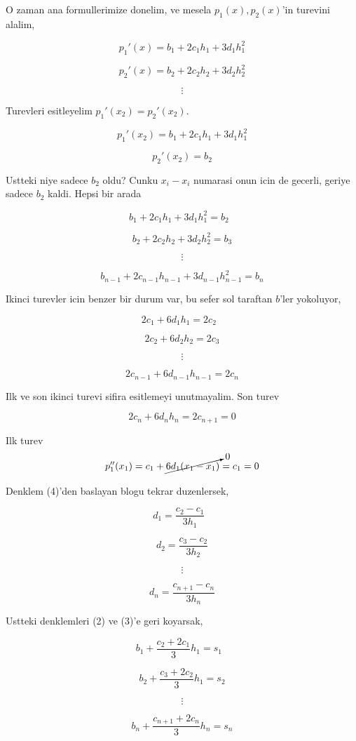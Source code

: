 \documentclass[12pt,fleqn]{article}\usepackage{common}
\begin{document}
O zaman ana formullerimize donelim, ve mesela $p_1(x),p_2(x)$'in turevini
alalim,

\[ p_1'(x) = b_1 + 2c_1h_1 + 3d_1h_1^2 \]

\[ p_2'(x) = b_2 + 2c_2h_2 + 3d_2h_2^2 \]

\[ \vdots \]


Turevleri esitleyelim $p_1'(x_2) = p_2'(x_2)$. 

\[ p_1'(x_2) = b_1 + 2c_1h_1 + 3d_1h_1^2 \]

\[  p_2'(x_2) = b_2 \]

Ustteki niye sadece $b_2$ oldu? Cunku $x_i-x_i$ numarasi onun icin de
gecerli, geriye sadece $b_2$ kaldi. Hepsi bir arada

\[  b_1 + 2c_1h_1 + 3d_1h_1^2  = b_2 \ \ \ \label{3}\]

\[  b_2 + 2c_2h_2 + 3d_2h_2^2 = b_3 \]

\[ \vdots \]

\[  b_{n-1} + 2c_{n-1}h_{n-1} + 3d_{n-1}h_{n-1}^2 =  b_n \]

Ikinci turevler icin benzer bir durum var, bu sefer sol taraftan $b$'ler
yokoluyor, 

\[ 2c_1 + 6d_1h_1 = 2c_2 \ \ \ \label{4} \]

\[ 2c_2 + 6d_2h_2 = 2c_3 \]

\[ \vdots \]

\[ 2c_{n-1} + 6d_{n-1}h_{n-1} = 2c_n \]

Ilk ve son ikinci turevi sifira esitlemeyi unutmayalim. Son turev

\[ 2c_n + 6d_nh_n = 2c_{n+1} = 0 \]

Ilk turev
\[ p_1''(x_1) =  c_1 + \cancelto{0}{6d_1(x_1-x_1)}  = c_1 = 0\]

Denklem (4)'den baslayan blogu tekrar duzenlersek, 

\[ d_1 = \frac{ c_2 - c_1}{3h_1} \ \ \ \label{5} \]

\[ d_2 = \frac{ c_3 - c_2}{3h_2} \]

\[ \vdots \]

\[ d_n = \frac{ c_{n+1} - c_n}{3h_n} \]

Ustteki denklemleri (2) ve (3)'e geri koyarsak,

\[ b_1 + \frac{ c_2 + 2c_1}{3}h_1 = s_1 \ \ \ \label{7} \]

\[ b_2 + \frac{ c_3 + 2c_2}{3}h_1 = s_2 \]

\[ \vdots \]

\[ b_n + \frac{ c_{n+1} + 2c_n}{3}h_n = s_n \]
\end{document}
